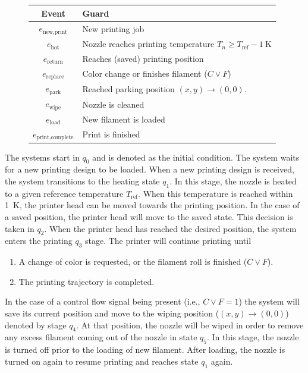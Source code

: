 \documentclass[a4paper,11pt]{article}
\begin{document}
\begin{figure}[H]
\begin{minipage}{0.48\linewidth}
        \small
        \renewcommand{\arraystretch}{1.2}
        \begin{tabularx}{\linewidth}{
            @{}c >{\raggedright\arraybackslash}X@{}
        }
            \toprule
            \textbf{Event} & \textbf{Guard} \\
            \midrule
            $e_{\text{new,print}}$      & New printing job \\
            $e_{\text{hot}}$     & Nozzle reaches printing temperature $T_n \geq T_{\text{ref}}-\SI{1}{\kelvin}$ \\
            $e_{\text{return}}$    & Reaches (saved) printing position \\
            $e_{\text{replace}}$ & Color change or finishes filament ($C \lor F$) \\
            $e_{\text{park}}$ & Reached parking position $(x,y) \rightarrow (0,0)$. \\
            $e_{\text{wipe}}$ & Nozzle is cleaned \\
            $e_{\text{load}}$ & New filament is loaded \\
            $e_{\text{print,complete}}$ & Print is finished \\
            \bottomrule
        \end{tabularx}
    \end{minipage}
\end{figure}

The systems start in $q_0$ and is denoted as the initial condition. The system waits for a new printing design to be loaded. When a new printing design is received, the system transitions to the heating state $q_1$. In this stage, the nozzle is heated to a given reference temperature $T_{\text{ref}}$. When this temperature is reached within \SI{1}{\kelvin}, the printer head can be moved towards the printing position. In the case of a saved position, the printer head will move to the saved state. This decision is taken in $q_2$. When the printer head has reached the desired position, the system enters the printing $q_3$ stage. The printer will continue printing until 
\begin{enumerate}
    \item A change of color is requested, or the filament roll is finished ($C \lor F$).
    \item The printing trajectory is completed.
\end{enumerate}  In the case of a control flow signal being present (i.e., $C \lor F = 1$) the system will save its current position and move to the wiping position ($(x,y) \rightarrow (0,0)$) denoted by stage $q_4$. At that position, the nozzle will be wiped in order to remove any excess filament coming out of the nozzle in state $q_5$. In this stage, the nozzle is turned off prior to the loading of new filament. After loading, the nozzle is turned on again to resume printing and reaches state $q_1$ again.
\end{document}
